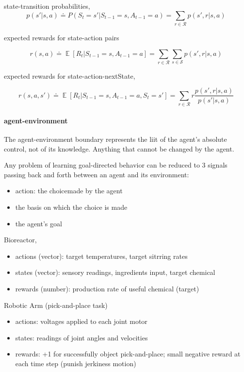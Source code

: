 \documentclass[lang=en,mode=geye,device=normal,color=blue,14pt]{elegantnote}
\DeclareMathOperator*{\E}{\mathbb{E}}
\DeclareMathOperator*{\1}{\mathbbm{1}}
\begin{document}
\begin{definition}
state-transition probabilities,
$$ p(s'|s,a) \doteq P(S_t=s'|S_{t-1}=s, A_{t-1}=a) = \sum_{r\in \mathcal{R}} p(s',r|s,a) $$
\end{definition}

\begin{definition}
expected rewards for state-action pairs

$$ r(s,a) \doteq \E [R_t | S_{t-1}=s, A_{t-1}=a] = \sum_{r\in \mathcal{R}} \sum_{s\in \mathcal{S}} p(s',r|s,a) $$
\end{definition}

\begin{definition}
expected rewards for state-action-nextState,

$$ r(s,a,s') \doteq \E [R_t | S_{t-1}=s, A_{t-1}=a, S_t=s'] = \sum_{r \in \mathcal{R}} r \frac{p(s',r|s,a)}{p(s'|s,a)} $$
\end{definition}


\paragraph{agent-environment}
The agent-environment boundary represents the liit of the agent's absolute control, not of its knowledge. Anything that cannot be changed by the agent.

Any problem of learning goal-directed behavior can be reduced to 3 signals passing back and forth between an agent and its environment:
\begin{itemize}
\item action: the choicemade by the agent
\item the basis on which the choice is made
\item the agent's goal
\end{itemize}

\begin{example}
Bioreactor,

\begin{itemize}
\item actions (vector): target temperatures, target sitrring rates
\item states (vector): sensory readings, ingredients input, target chemical
\item rewards (number): production rate of useful chemical (target)
\end{itemize}

\end{example}

\begin{example}
Robotic Arm (pick-and-place task)

\begin{itemize}
\item actions: voltages applied to each joint motor
\item states: readings of joint angles and velocities
\item rewards: +1 for successfully object pick-and-place; small negative reward at each time step (punish jerkiness motion)
\end{itemize}
\end{example}
\end{document}
